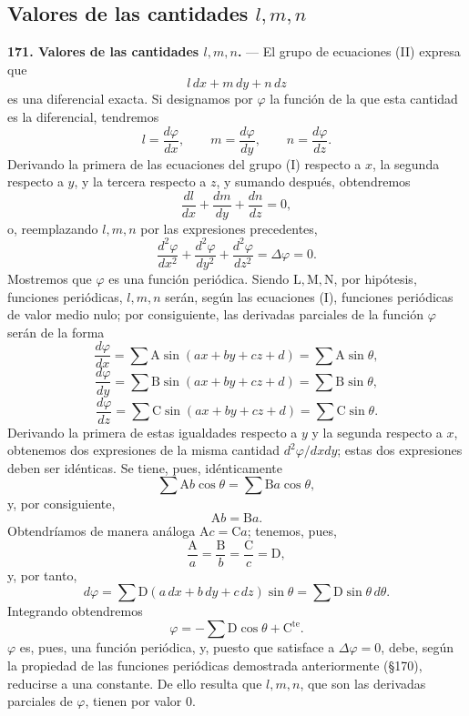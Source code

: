 \subsection{Valores de las cantidades \texorpdfstring{$l,m,n$}{l, m, n}}

\noindent\textbf{171. Valores de las cantidades $l,m,n$.} — El grupo de
ecuaciones (II) expresa que
\[
l\,dx+m\,dy+n\,dz
\]
es una diferencial exacta. Si designamos por $\varphi$ la función de la
que esta cantidad es la diferencial, tendremos
\[
l=\frac{d\varphi}{dx},\qquad m=\frac{d\varphi}{dy},\qquad n=\frac{d\varphi}{dz}.
\]
Derivando la primera de las ecuaciones del grupo (I) respecto a $x$, la
segunda respecto a $y$, y la tercera respecto a $z$, y sumando después,
obtendremos
\[
\frac{dl}{dx}+\frac{dm}{dy}+\frac{dn}{dz}=0,
\]
o, reemplazando $l,m,n$ por las expresiones precedentes,
\[
\frac{d^2\varphi}{dx^2}+\frac{d^2\varphi}{dy^2}+\frac{d^2\varphi}{dz^2}=\Delta\varphi=0.
\]
Mostremos que $\varphi$ es una función periódica. Siendo $\mathrm
L,\mathrm M,\mathrm N$, por hipótesis, funciones periódicas, $l,m,n$ serán,
según las ecuaciones (I), funciones periódicas de valor medio nulo; por
consiguiente, las derivadas parciales de la función $\varphi$ serán de la
forma
\[
\frac{d\varphi}{dx}=\sum \mathrm A\sin(ax+by+cz+d)=\sum \mathrm A\sin\theta,
\]
\[
\frac{d\varphi}{dy}=\sum \mathrm B\sin(ax+by+cz+d)=\sum \mathrm B\sin\theta,
\]
\[
\frac{d\varphi}{dz}=\sum \mathrm C\sin(ax+by+cz+d)=\sum \mathrm C\sin\theta.
\]
Derivando la primera de estas igualdades respecto a $y$ y la segunda
respecto a $x$, obtenemos dos expresiones de la misma cantidad
$d^2\varphi/dxdy$; estas dos expresiones deben ser idénticas. Se tiene,
pues, idénticamente
\[
\sum \mathrm Ab\cos\theta=\sum \mathrm Ba\cos\theta,
\]
y, por consiguiente,
\[
\mathrm Ab=\mathrm Ba.
\]
Obtendríamos de manera análoga $\mathrm Ac=\mathrm Ca$; tenemos, pues,
\[
\frac{\mathrm A}{a}=\frac{\mathrm B}{b}=\frac{\mathrm C}{c}=\mathrm D,
\]
y, por tanto,
\[
d\varphi=\sum \mathrm D(a\,dx+b\,dy+c\,dz)\sin\theta=\sum \mathrm D\sin\theta\,d\theta.
\]
Integrando obtendremos
\[
\varphi=-\sum \mathrm D\cos\theta+\mathrm{C^{te}}.
\]
$\varphi$ es, pues, una función periódica, y, puesto que satisface a
$\Delta\varphi=0$, debe, según la propiedad de las funciones periódicas
demostrada anteriormente (§170), reducirse a una constante. De ello
resulta que $l,m,n$, que son las derivadas parciales de $\varphi$, tienen
por valor $0$.


